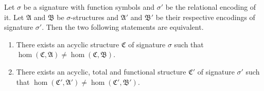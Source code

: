 \begin{lemma}
	Let $\sigma$ be a signature with function symbols and $\sigma'$ be the relational encoding of it.
	Let $\mathfrak A$ and $\mathfrak B$ be $\sigma$-structures and $\mathfrak A'$ and $\mathfrak B'$ be their respective encodings of signature $\sigma'$.
	Then the two following statements are equivalent.
	\begin{enumerate}
		\item There exists an acyclic structure $\mathfrak C$ of signature $\sigma$ such that $\hom(\mathfrak C,\mathfrak A)\neq\hom(\mathfrak C,\mathfrak B)$.
		\item There exists an acyclic, total and functional structure $\mathfrak C'$ of signature $\sigma'$ such that $\hom(\mathfrak C',\mathfrak A')\neq \hom(\mathfrak C',\mathfrak B')$.
	\end{enumerate}
	\label{lem:acycTotalAndFunctionalEquivAcyc}
\end{lemma}
